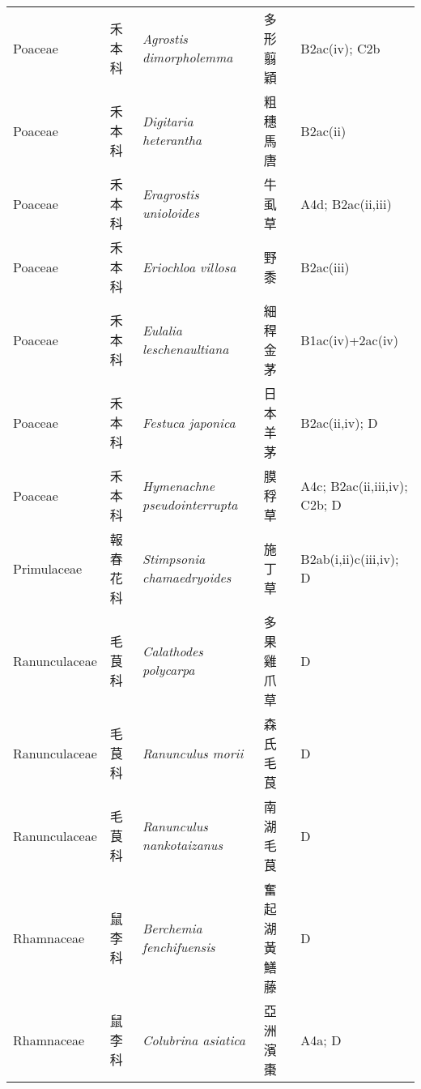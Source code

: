 {\begin{longtable}{p{2.5cm}p{2.5cm}p{4.5cm}p{2.5cm}p{3cm}}
    Poaceae & 禾本科 & \textit{Agrostis dimorpholemma}  & 多形翦穎 & B2ac(iv); C2b \index{Agrostis@\textit{Agrostis}!dimorpholemma@\textit{dimorpholemma}}  \index{多形翦穎} \\
    Poaceae & 禾本科 & \textit{Digitaria heterantha}  & 粗穗馬唐 & B2ac(ii) \index{Digitaria@\textit{Digitaria}!heterantha@\textit{heterantha}}  \index{粗穗馬唐} \\
    Poaceae & 禾本科 & \textit{Eragrostis unioloides}  & 牛虱草 & A4d; B2ac(ii,iii) \index{Eragrostis@\textit{Eragrostis}!unioloides@\textit{unioloides}}  \index{牛虱草} \\
    Poaceae & 禾本科 & \textit{Eriochloa villosa}  & 野黍 & B2ac(iii) \index{Eriochloa@\textit{Eriochloa}!villosa@\textit{villosa}}  \index{野黍} \\
    Poaceae & 禾本科 & \textit{Eulalia leschenaultiana}  & 細稈金茅 & B1ac(iv)+2ac(iv) \index{Eulalia@\textit{Eulalia}!leschenaultiana@\textit{leschenaultiana}}  \index{細稈金茅} \\
    Poaceae & 禾本科 & \textit{Festuca japonica}  & 日本羊茅 & B2ac(ii,iv); D \index{Festuca@\textit{Festuca}!japonica@\textit{japonica}}  \index{日本羊茅} \\
    Poaceae & 禾本科 & \textit{Hymenachne pseudointerrupta}  & 膜稃草 & A4c; B2ac(ii,iii,iv); C2b; D \index{Hymenachne@\textit{Hymenachne}!pseudointerrupta@\textit{pseudointerrupta}}  \index{膜稃草} \\
    Primulaceae & 報春花科 & \textit{Stimpsonia chamaedryoides}  & 施丁草 & B2ab(i,ii)c(iii,iv); D \index{Stimpsonia@\textit{Stimpsonia}!chamaedryoides@\textit{chamaedryoides}}  \index{施丁草} \\
    Ranunculaceae & 毛茛科 & \textit{Calathodes polycarpa}  & 多果雞爪草 & D \index{Calathodes@\textit{Calathodes}!polycarpa@\textit{polycarpa}}  \index{多果雞爪草} \\
    Ranunculaceae & 毛茛科 & \textit{Ranunculus morii}  & 森氏毛茛 & D \index{Ranunculus@\textit{Ranunculus}!morii@\textit{morii}}  \index{森氏毛茛} \\
    Ranunculaceae & 毛茛科 & \textit{Ranunculus nankotaizanus}  & 南湖毛茛 & D \index{Ranunculus@\textit{Ranunculus}!nankotaizanus@\textit{nankotaizanus}}  \index{南湖毛茛} \\
    Rhamnaceae & 鼠李科 & \textit{Berchemia fenchifuensis}  & 奮起湖黃鱔藤 & D \index{Berchemia@\textit{Berchemia}!fenchifuensis@\textit{fenchifuensis}}  \index{奮起湖黃鱔藤} \\
    Rhamnaceae & 鼠李科 & \textit{Colubrina asiatica}  & 亞洲濱棗 & A4a; D \index{Colubrina@\textit{Colubrina}!asiatica@\textit{asiatica}}  \index{亞洲濱棗} \\

\end{longtable}}
